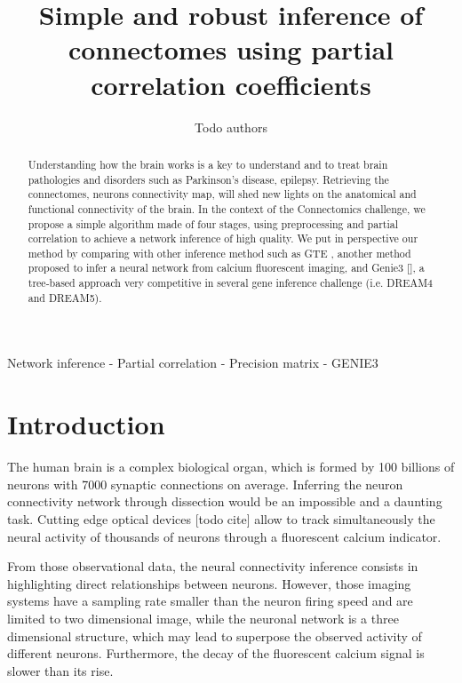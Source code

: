 \documentclass[wcp]{jmlr}
\title[Inference of connectomes using partial correlation coefficients]{Simple and robust inference of connectomes using partial correlation coefficients}
\author{Todo authors}
\begin{document}
\maketitle


\begin{abstract} Understanding how the brain works is a key to understand and
to treat brain pathologies and disorders such as Parkinson's disease,
epilepsy. Retrieving the connectomes, neurons connectivity map, will shed new
lights on the anatomical and functional connectivity of the brain. In the
context of the Connectomics challenge, we propose a simple  algorithm made of
four stages, using preprocessing and partial correlation to achieve a network
inference of high quality. We put in perspective our method by comparing
with other inference method such as GTE \cite{stetter2012model}, another
method proposed to infer a neural network from calcium fluorescent imaging,
and Genie3 [], a tree-based approach very competitive in several gene
inference challenge (i.e. DREAM4 and DREAM5).


\end{abstract}

\begin{keywords}
Network inference - Partial correlation - Precision matrix - GENIE3
\end{keywords}


\section{Introduction}\label{sec:intro}

The human brain is a complex biological organ, which is formed by 100
billions of neurons with 7000 synaptic connections on average. Inferring the
neuron connectivity network through dissection would be an impossible
and a daunting task. Cutting edge optical devices [todo cite] allow to track
simultaneously the neural activity of thousands of neurons through a fluorescent
calcium indicator.

From those observational data, the neural connectivity inference consists in
highlighting direct relationships between neurons. However, those imaging
systems have a sampling rate smaller than the neuron firing speed and are
limited to two dimensional image, while the neuronal network is a
three dimensional structure, which may lead to superpose the observed activity
of different neurons. Furthermore, the decay of the fluorescent calcium signal
is slower than its rise.
\end{document}
